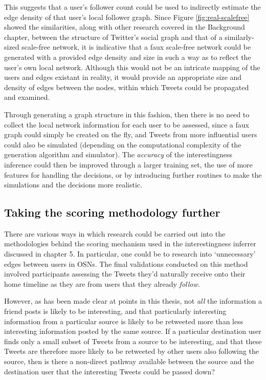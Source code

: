 This suggests that a user's follower count could be used to indirectly estimate the edge density of that user's local follower graph. Since Figure \ref{fig:real-scalefree} showed the similarities, along with other research covered in the Background chapter, between the structure of Twitter's social graph and that of a similarly-sized scale-free network, it is indicative that a faux scale-free network could be generated with a provided edge density and size in such a way as to reflect the user's own local network. Although this would not be an intricate mapping of the users and edges existant in reality, it would provide an appropriate size and density of edges between the nodes, within which Tweets could be propagated and examined.

Through generating a graph structure in this fashion, then there is no need to collect the local network information for each user to be assessed, since a faux graph could simply be created on the fly, and Tweets from more influential users could also be simulated (depending on the computational complexity of the generation algorithm and simulator). The \textit{accuracy} of the interestingness inference could then be improved through a larger training set, the use of more features for handling the decisions, or by introducing further routines to make the simulations and the decisions more realistic. 


\subsection{Taking the scoring methodology further}
There are various ways in which research could be carried out into the methodologies behind the scoring mechanism used in the interestingness inferrer discussed in chapter 5. In particular, one could be to research into `unnecessary' edges between users in OSNs. The final validations conducted on this method involved participants assessing the Tweets they'd naturally receive onto their home timeline as they are from users that they already \textit{follow}. 

However, as has been made clear at points in this thesis, not \textit{all} the information a friend posts is likely to be interesting, and that particularly interesting information from a particular source is likely to be retweeted more than less interesting information posted by the same source. If a particular destination user finds only a small subset of Tweets from a source to be interesting, and that these Tweets are therefore more likely to be retweeted by other users also following the source, then is there a non-direct pathway available between the source and the destination user that the interesting Tweets could be passed down?

